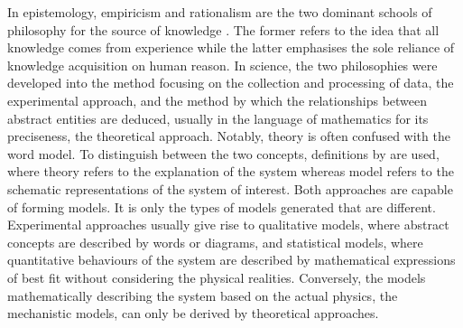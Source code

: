 In epistemology, empiricism and rationalism are the two dominant schools of philosophy for the source of knowledge \citep{Solomon2006ThePhilosophy}. The former refers to the idea that all knowledge comes from experience while the latter emphasises the sole reliance of knowledge acquisition on human reason. In science, the two philosophies were developed into the method focusing on the collection and processing of data, the experimental approach, and the method by which the relationships between abstract entities are deduced, usually in the language of mathematics for its preciseness, the theoretical approach. Notably, theory is often confused with the word model. To distinguish between the two concepts, definitions by \cite{Jaynes1976The/} are used, where theory refers to the explanation of the system whereas model refers to the schematic representations of the system of interest. Both approaches are capable of forming models. It is only the types of models generated that are different. Experimental approaches usually give rise to qualitative models, where abstract concepts are described by words or diagrams, and statistical models, where quantitative behaviours of the system are described by mathematical expressions of best fit without considering the physical realities. Conversely, the models mathematically describing the system based on the actual physics, the mechanistic models, can only be derived by theoretical approaches. 

